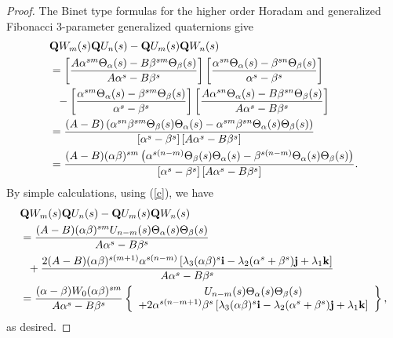 \documentclass{kms-c}
\theoremstyle{plain}
\theoremstyle{definition}
\theoremstyle{remark}
\begin{document}
\begin{proof}
The Binet type formulas for the higher order Horadam and generalized Fibonacci 3-parameter generalized quaternions give
\begin{align*}
&\textnormal{\textbf{Q}}W_{m}(s)\textnormal{\textbf{Q}}U_{n}(s)-\textnormal{\textbf{Q}}U_{m}(s)\textnormal{\textbf{Q}}W_{n}(s)\\
&=\left[\frac{A\alpha^{sm}\Theta_{\alpha}(s)-B\beta^{sm}\Theta_{\beta}(s)}{A\alpha^{s}-B\beta^{s}}\right]\left[\frac{\alpha^{sn}\Theta_{\alpha}(s)-\beta^{sn}\Theta_{\beta}(s)}{\alpha^{s}-\beta^{s}}\right]\\
&\ \ - \left[\frac{\alpha^{sm}\Theta_{\alpha}(s)-\beta^{sm}\Theta_{\beta}(s)}{\alpha^{s}-\beta^{s}}\right]\left[\frac{A\alpha^{sn}\Theta_{\alpha}(s)-B\beta^{sn}\Theta_{\beta}(s)}{A\alpha^{s}-B\beta^{s}}\right]\\
&=\frac{(A-B)\left(\alpha^{sn}\beta^{sm}\Theta_{\beta}(s)\Theta_{\alpha}(s)-\alpha^{sm}\beta^{sn}\Theta_{\alpha}(s)\Theta_{\beta}(s)\right)}{\left[\alpha^{s}-\beta^{s}\right]\left[A\alpha^{s}-B\beta^{s}\right]}\\
&=\frac{(A-B)(\alpha\beta)^{sm}\left(\alpha^{s(n-m)}\Theta_{\beta}(s)\Theta_{\alpha}(s)-\beta^{s(n-m)}\Theta_{\alpha}(s)\Theta_{\beta}(s)\right)}{\left[\alpha^{s}-\beta^{s}\right]\left[A\alpha^{s}-B\beta^{s}\right]}.
\end{align*}
By simple calculations, using (\ref{c}), we have
\begin{align*}
&\textnormal{\textbf{Q}}W_{m}(s)\textnormal{\textbf{Q}}U_{n}(s)-\textnormal{\textbf{Q}}U_{m}(s)\textnormal{\textbf{Q}}W_{n}(s)\\
&=\frac{(A-B)(\alpha\beta)^{sm}U_{n-m}(s)\Theta_{\alpha}(s)\Theta_{\beta}(s)}{A\alpha^{s}-B\beta^{s}}\\
&\ \ + \frac{2(A-B)(\alpha\beta)^{s(m+1)}\alpha^{s(n-m)}\left[\lambda_{3}(\alpha\beta)^{s}\textbf{i}-\lambda_{2}(\alpha^{s}+\beta^{s})\textbf{j}+\lambda_{1}\textbf{k}\right]}{A\alpha^{s}-B\beta^{s}}\\
&=\frac{(\alpha-\beta)W_{0}(\alpha\beta)^{sm}}{A\alpha^{s}-B\beta^{s}}\left\lbrace \begin{array}{c} 
U_{n-m}(s)\Theta_{\alpha}(s)\Theta_{\beta}(s)\\
+2\alpha^{s(n-m+1)}\beta^{s}\left[\lambda_{3}(\alpha\beta)^{s}\textbf{i}-\lambda_{2}(\alpha^{s}+\beta^{s})\textbf{j}+\lambda_{1}\textbf{k}\right]
\end{array}\right\rbrace ,
\end{align*}
as desired.
\end{proof}
\end{document}

